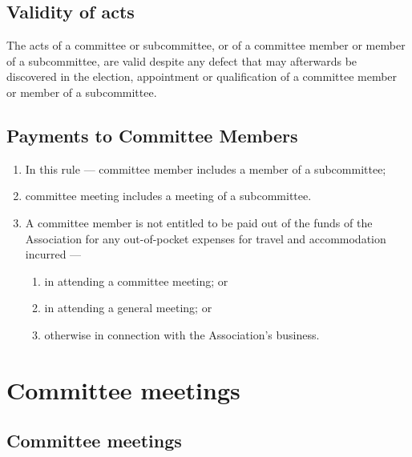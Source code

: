 \documentclass[../constitution.tex]{subfiles}
\begin{document}
\hypertarget{validity-of-acts}{%
\subsection{Validity of acts}\label{validity-of-acts}}

The acts of a committee or subcommittee, or of a committee member or member of a subcommittee, are valid despite any defect that may afterwards be discovered in the election, appointment or qualification of a committee member or member of a subcommittee.

\hypertarget{payments-to-committee-members}{%
\subsection{Payments to Committee Members}\label{payments-to-committee-members}}

\begin{enumerate}

\item In this rule --- committee member includes a member of a subcommittee;
\item committee meeting includes a meeting of a subcommittee.
\item A committee member is not entitled to be paid out of the funds of the Association for any out-of-pocket expenses for travel and accommodation incurred ---

  \begin{enumerate}
  
  \item in attending a committee meeting; or
  \item in attending a general meeting; or
  \item otherwise in connection with the Association's business.
  \end{enumerate}
\end{enumerate}

\hypertarget{division-4-committee-meetings}{%
\section{Committee meetings}\label{division-4-committee-meetings}}

\hypertarget{committee-meetings}{%
\subsection{Committee meetings}\label{committee-meetings}}
\end{document}
